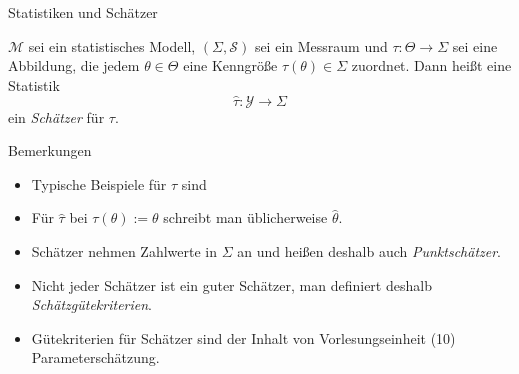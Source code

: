 \documentclass[
  8pt,
  ignorenonframetext,
]{beamer}
\providecommand{\tightlist}{%
  \setlength{\itemsep}{0pt}\setlength{\parskip}{0pt}}
\begin{document}
\begin{frame}{Statistiken und Schätzer}
\protect\hypertarget{statistiken-und-schuxe4tzer-2}{}
\small
\begin{definition}[Schätzer]
\justifying
$\mathcal{M}$ sei ein statistisches Modell, $(\Sigma,\mathcal{S})$ sei ein Messraum  
und $\tau : \Theta \to \Sigma$ sei eine Abbildung, die jedem $\theta \in \Theta$ 
eine Kenngröße $\tau(\theta) \in \Sigma$ zuordnet. Dann heißt eine Statistik 
\begin{equation}
\hat{\tau} : \mathcal{Y} \to \Sigma
\end{equation}
ein \textit{Schätzer} für $\tau$.
\end{definition}

\small

Bemerkungen

\begin{itemize}
\tightlist
\item
  Typische Beispiele für \(\tau\) sind

  \begin{itemize}
  \end{itemize}
\item
  Für \(\hat{\tau}\) bei \(\tau(\theta) := \theta\) schreibt man
  üblicherweise \(\hat{\theta}\).
\item
  Schätzer nehmen Zahlwerte in \(\Sigma\) an und heißen deshalb auch
  \emph{Punktschätzer}.
\item
  Nicht jeder Schätzer ist ein guter Schätzer, man definiert deshalb
  \emph{Schätzgütekriterien}.
\item
  Gütekriterien für Schätzer sind der Inhalt von Vorlesungseinheit (10)
  Parameterschätzung.
\end{itemize}
\end{frame}
\end{document}
